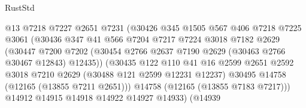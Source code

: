 \begin{lexlean}{RustStd}
\begin{coremodule}
                                  @13
                                  @7218
                                  @7227
                                  @2651
                                  @7231
                                  (@30426
                                    @345
                                    @1505
                                    @567
                                    @406
                                    @7218
                                    @7225
                                    @3061
                                    (@30436
                                      @347
                                      @41
                                      @566
                                      @7204
                                      @7217
                                      @7224
                                      @3018
                                      @7182
                                      @2629
                                      (@30447
                                        @7200
                                        @7202
                                        (@30454
                                          @2766
                                          @2637
                                          @7190
                                          @2629
                                          (@30463 @2766 @30467 @12843)
                                          @12435))
                                      (@30435
                                        @122
                                        @110
                                        @41
                                        @16
                                        @2599
                                        @2651
                                        @2592
                                        @3018
                                        @7210
                                        @2629
                                        (@30488 @121 @2599 @12231 @12237)
                                        @30495
                                        @14758
                                        (@12165 (@13855 @7211 @2651)))
                                      @14758
                                      (@12165 (@13855 @7183 @7217)))
                                    @14912
                                    @14915
                                    @14918
                                    @14922
                                    @14927
                                    @14933)
                                  (@14939

\end{coremodule}
\end{lexlean}
